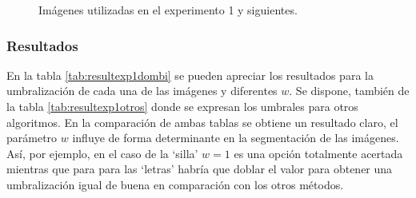 \documentclass[main]{subfiles}
\begin{document}
\begin{figure}
    \quad
    \caption{Imágenes utilizadas en el experimento 1 y siguientes.}
    \label{fig:imagenes}
\end{figure}


\subsubsection{Resultados}
En la tabla \ref{tab:resultexp1dombi} se pueden apreciar los resultados para la umbralización de cada una de las imágenes y diferentes $w$. Se dispone, también de la tabla \ref{tab:resultexp1otros} donde se expresan los umbrales para otros algoritmos. En la comparación de ambas tablas se obtiene un resultado claro, el parámetro $w$ influye de forma determinante en la segmentación de las imágenes. Así, por ejemplo, en el caso de la `silla' $w=1$ es una opción totalmente acertada mientras que para para las `letras' habría que doblar el valor para obtener una umbralización igual de buena en comparación con los otros métodos.
\end{document}

